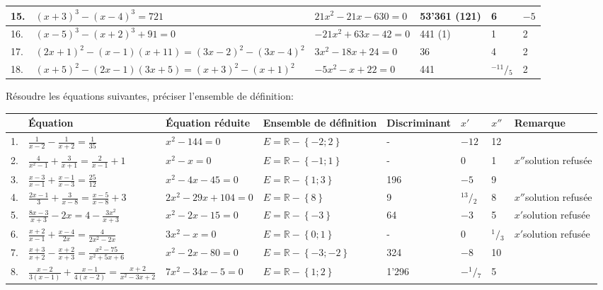 \begin{landscape}
\begin{solution}
\begin{tabular}{|l|l|l|l|l|l|}
\hline
15.	&${{\left( x+3 \right)}^{3}}-{{\left( x-4 \right)}^{3}}=721$	&$21{{x}^{2}}-21x-630=0$	&53'361 (121)	&6	&$-5$\\
\hline
16.	&${{\left( x-5 \right)}^{3}}-{{\left( x+2 \right)}^{3}}+91=0$	&$-21{{x}^{2}}+63x-42=0$	&441 (1)	&1	&2\\
\hline
17.	&${{\left( 2x+1 \right)}^{2}}-\left( x-1 \right)\left( x+11 \right)={{\left( 3x-2 \right)}^{2}}-{{\left( 3x-4 \right)}^{2}}$	&$3{{x}^{2}}-18x+24=0$	&36	&4	&2\\
\hline
18.	&${{\left( x+5 \right)}^{2}}-\left( 2x-1 \right)\left( 3x+5 \right)={{\left( x+3 \right)}^{2}}-{{\left( x+1 \right)}^{2}}$	&$-5{{x}^{2}}-x+22=0$	&441	&${}^{-11}/{}_{5}$	&2\\
\hline
\end{tabular}

\end{solution}

\begin{solution}
Résoudre les équations suivantes, préciser l'ensemble de définition:

\begin{tabular}{|l|l|l|l|l|l|l|l}
\hline
	& Équation	&Équation réduite	&Ensemble de définition	&Discriminant	&${x}'$	&${x}''$	&Remarque\\
\hline
1.	&$\frac{1}{x-2}-\frac{1}{x+2}=\frac{1}{35}$	&${{x}^{2}}-144=0$	&$E=\mathbb{R}-\left\{ -2;2 \right\}$	&-	&$-12$	&12	\\
\hline
2.	&$\frac{4}{{{x}^{2}}-1}+\frac{3}{x+1}=\frac{2}{x-1}+1$	&${{x}^{2}}-x=0$	&$E=\mathbb{R}-\left\{ -1;1 \right\}$	&-	&0	&1	&${x}''$solution refusée\\
\hline
3.	&$\frac{x-3}{x-1}+\frac{x-1}{x-3}=\frac{25}{12}$	&${{x}^{2}}-4x-45=0$	&$E=\mathbb{R}-\left\{ 1;3 \right\}$	&196	&$-5$	&9	\\
\hline
4.	&$\frac{2x-1}{3}+\frac{3}{x-8}=\frac{x-5}{x-8}+3$	&$2{{x}^{2}}-29x+104=0$	&$E=\mathbb{R}-\left\{ 8 \right\}$	&9	&${}^{13}/{}_{2}$	&8	&${x}''$solution refusée\\
\hline
5.	&$\frac{8x-3}{x+3}-2x=4-\frac{3{{x}^{2}}}{x+3}$	&${{x}^{2}}-2x-15=0$	&$E=\mathbb{R}-\left\{ -3 \right\}$	&64	&$-3$	&5	&${x}'$solution refusée\\
\hline
6.	&$\frac{x+2}{x-1}+\frac{x-4}{2x}=\frac{4}{2{{x}^{2}}-2x}$	&$3{{x}^{2}}-x=0$	&$E=\mathbb{R}-\left\{ 0;1 \right\}$	&-	&0	&${}^{1}/{}_{3}$	&${x}'$solution refusée\\
\hline
7.	&$\frac{x+3}{x+2}-\frac{x+2}{x+3}=\frac{{{x}^{2}}-75}{{{x}^{2}}+5x+6}$	&${{x}^{2}}-2x-80=0$	&$E=\mathbb{R}-\left\{ -3;-2 \right\}$	&324	&$-8$	&10	\\
\hline
8.	&$\frac{x-2}{3\left( x-1 \right)}+\frac{x-1}{4\left( x-2 \right)}=\frac{x+2}{{{x}^{2}}-3x+2}$	&$7{{x}^{2}}-34x-5=0$	&$E=\mathbb{R}-\left\{ 1;2 \right\}$	&1'296	&$-{}^{1}/{}_{7}$	&5	\\
\hline
\end{tabular}
\end{solution}


\end{landscape}
